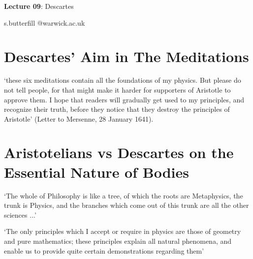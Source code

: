 \documentclass[12pt]{extarticle}
\date{}
\makeatletter
\def \ititle {Descartes}
\def \isubtitle {Lecture 02}
\def \iemail{s.butterfill @warwick.ac.uk}
\makeatother
\begin{document}
\begin{multicols*}{3}

\setlength\footnotesep{1em}









      
\def \ititle {Lecture 09}
 
\def \isubtitle {Descartes}
 
\begin{center}
 
{\Large
 
\textbf{\ititle}: \isubtitle
 
}
 
 
 
\iemail %
 
\end{center}
 
 
 
\section{Descartes’ Aim in The Meditations}
 
‘these six meditations contain all the foundations of my physics.  But please do not tell people, for that might make it harder for supporters of Aristotle to approve them.  I hope that readers will gradually get used to my principles, and recognize their truth,  before they notice that  they destroy the principles of Aristotle’ 
(Letter to Mersenne, 28 January 1641).
 
 
\section{Aristotelians vs Descartes on the Essential Nature of Bodies}
 
‘The whole of Philosophy is like a tree, of which the  roots are Metaphysics, the trunk is Physics, and the branches which come out of this trunk are all the other sciences ...’ 
\citep[p.~186, AT IX:14]{descartes:1985_csm1}
 
‘The only principles which I accept or require in physics are those of geometry and pure mathematics;
these principles explain all natural phenomena, and enable us to provide quite certain demonstrations 
regarding them’
\citep[p.~247, AT 2:64]{descartes:1985_csm1}
 

\end{multicols*}
\end{document}
